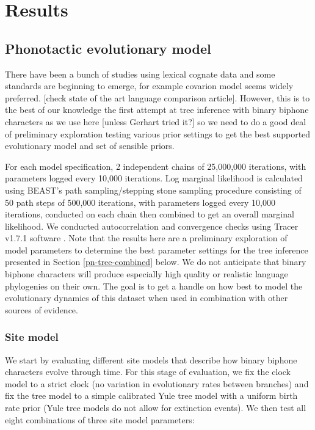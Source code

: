 \documentclass[]{article}
\begin{document}
\hypertarget{pn-tree-results}{%
\section{Results}\label{pn-tree-results}}

\hypertarget{phonotactic-evo-model}{%
\subsection{Phonotactic evolutionary model}\label{phonotactic-evo-model}}

There have been a bunch of studies using lexical cognate data and some standards are beginning to emerge, for example covarion model seems widely preferred. {[}check state of the art language comparison article{]}. However, this is to the best of our knowledge the first attempt at tree inference with binary biphone characters as we use here {[}unless Gerhart tried it?{]} so we need to do a good deal of preliminary exploration testing various prior settings to get the best supported evolutionary model and set of sensible priors.

For each model specification, 2 independent chains of 25,000,000 iterations, with parameters logged every 10,000 iterations. Log marginal likelihood is calculated using BEAST's path sampling/stepping stone sampling procedure \autocites{baele_improving_2012}{baele_accurate_2013} consisting of 50 path steps of 500,000 iterations, with parameters logged every 10,000 iterations, conducted on each chain then combined to get an overall marginal likelihood. We conducted autocorrelation and convergence checks using Tracer v1.7.1 software \autocite{rambaut_posterior_2018}. Note that the results here are a preliminary exploration of model parameters to determine the best parameter settings for the tree inference presented in Section \ref{pn-tree-combined} below. We do not anticipate that binary biphone characters will produce especially high quality or realistic language phylogenies on their own. The goal is to get a handle on how best to model the evolutionary dynamics of this dataset when used in combination with other sources of evidence.

\hypertarget{site-model}{%
\subsubsection{Site model}\label{site-model}}

We start by evaluating different site models that describe how binary biphone characters evolve through time. For this stage of evaluation, we fix the clock model to a strict clock (no variation in evolutionary rates between branches) and fix the tree model to a simple calibrated Yule tree model with a uniform birth rate prior (Yule tree models do not allow for extinction events). We then test all eight combinations of three site model parameters:
\end{document}
